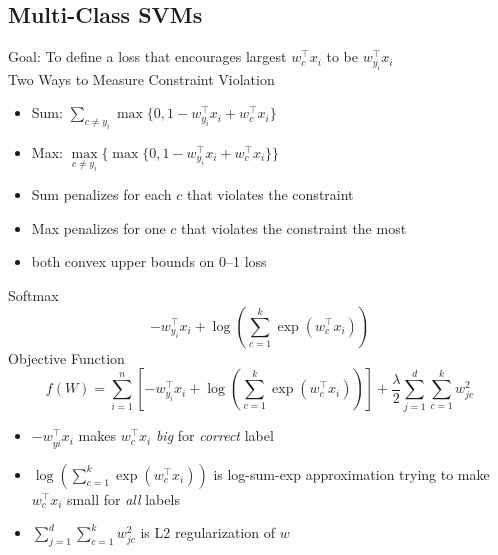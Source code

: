 \documentclass[10pt,landscape,a4paper]{article}
\begin{document}
\begin{multicols*}{5}
\subsection{Multi-Class SVMs}
Goal: To define a loss that encourages largest \(w_c^\intercal x_i\) to be \(w_{y_i}^\intercal x_i\) \\
Two Ways to Measure Constraint Violation
\begin{itemize}
    \item Sum: \(\sum\limits_{c \neq y_i} \max\{0, 1 - w_{y_i}^\intercal x_i + w_c^\intercal x_i\}\)
    \item Max: \(\max\limits_{c \neq y_i}\{\max\{0, 1 - w_{y_i}^\intercal x_i + w_c^\intercal x_i\}\}\)
\end{itemize}
\begin{itemize}
    \item Sum penalizes for each \(c\) that violates the constraint
    \item Max penalizes for one \(c\) that violates the constraint the most
    \item both convex upper bounds on 0--1 loss
\end{itemize}
Softmax
\begin{dmath*}
    -w_{y_i}^\intercal x_i + \log(\sum_{c=1}^{k} \exp(w_c^\intercal x_i))
\end{dmath*}
Objective Function
\begin{dmath*}
    f(W) = \sum_{i=1}^{n}[-w_{y_i}^\intercal x_i + \log(\sum_{c=1}^{k} \exp(w_c^\intercal x_i))] + \frac{\lambda}{2} \sum_{j=1}^{d} \sum_{c=1}^{k} w_{jc}^2
\end{dmath*}
\begin{itemize}
    \item \(-w_{yi}^\intercal x_i\) makes \(w_c^\intercal x_i\) \emph{big} for \emph{correct} label
    \item \(\log(\sum\limits_{c=1}^{k}\exp(w_c^\intercal x_i))\) is log-sum-exp approximation trying to make \(w_c^\intercal x_i\) small for \emph{all} labels
    \item \(\sum_{j=1}^{d} \sum_{c=1}^{k} w_{jc}^2\) is L2 regularization of \(w\)
\end{itemize}


\end{multicols*}
\end{document}
